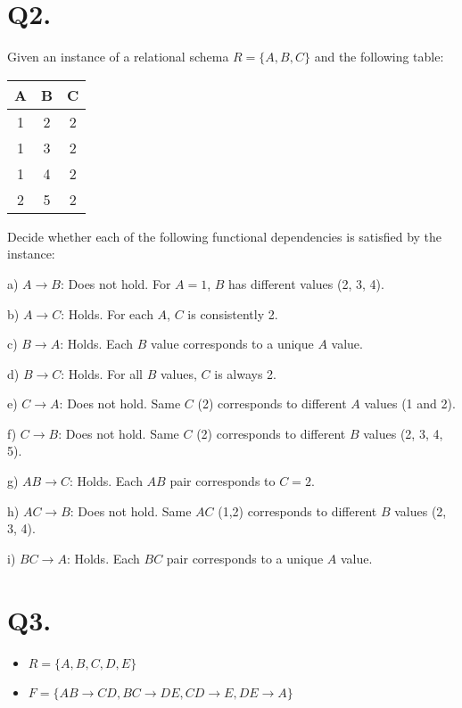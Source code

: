 \documentclass[12pt]{article}
\begin{document}
	\section*{Q2.}
Given an instance of a relational schema \( R = \{ A, B, C \} \) and the following table:

\begin{table}[h]
	\centering
	\begin{tabular}{ccc}
		\toprule
		A & B & C \\
		\midrule
		1 & 2 & 2 \\
		1 & 3 & 2 \\
		1 & 4 & 2 \\
		2 & 5 & 2 \\
		\bottomrule
	\end{tabular}
\end{table}

Decide whether each of the following functional dependencies is satisfied by the instance:


a) \( A \rightarrow B \): Does not hold. For \( A = 1 \), \( B \) has different values (2, 3, 4).

b) \( A \rightarrow C \): Holds. For each \( A \), \( C \) is consistently 2.

c) \( B \rightarrow A \): Holds. Each \( B \) value corresponds to a unique \( A \) value.

d) \( B \rightarrow C \): Holds. For all \( B \) values, \( C \) is always 2.

e) \( C \rightarrow A \): Does not hold. Same \( C \) (2) corresponds to different \( A \) values (1 and 2).

f) \( C \rightarrow B \): Does not hold. Same \( C \) (2) corresponds to different \( B \) values (2, 3, 4, 5).

g) \( AB \rightarrow C \): Holds. Each \( AB \) pair corresponds to \( C = 2 \).

h) \( AC \rightarrow B \): Does not hold. Same \( AC \) (1,2) corresponds to different \( B \) values (2, 3, 4).

i) \( BC \rightarrow A \): Holds. Each \( BC \) pair corresponds to a unique \( A \) value.

	\section*{Q3.}
\begin{itemize}
	\item \( R = \{ A, B, C, D, E \} \)
	\item \( F = \{ AB \rightarrow CD, BC \rightarrow DE, CD \rightarrow E, DE \rightarrow A \} \)
\end{itemize}
\end{document}
